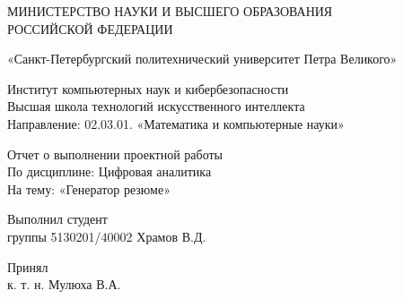 \documentclass[a4paper, 14pt]{extarticle} %
\begin{document}
    \begin{titlepage}
        \thispagestyle{empty}
        
        \begin{center}
        
            { \large МИНИСТЕРСТВО НАУКИ И ВЫСШЕГО ОБРАЗОВАНИЯ \\ 
                РОССИЙСКОЙ ФЕДЕРАЦИИ }
             
            { «Санкт-Петербургский политехнический университет Петра Великого» }
            
            { Институт компьютерных наук и кибербезопасности \\ 
                Высшая школа технологий искусственного интеллекта \\
                Направление: 02.03.01. «Математика и компьютерные науки» \\ }        
              
              \vspace{3cm}
            { \large Отчет о выполнении проектной работы\\ 
              По дисциплине: Цифровая аналитика \\ 
              На тему: «Генератор резюме»}
    
        \end{center}
    
        \vspace{3cm}

        \begin{center}
            \noindent
            \begin{minipage}[t]{\textwidth}
                \raggedright Выполнил студент  \\ группы 5130201/40002 \hfill 
                \underline{\hspace{3cm}} Храмов В.Д.
            \end{minipage}
            
            \vspace{1cm}
            
            \noindent
            \begin{minipage}[t]{\textwidth}
                \raggedright Принял \\ к. т. н. \hfill 
                \underline{\hspace{3cm}} Мулюха В.А.
            \end{minipage}
        \end{center}
        

\end{titlepage}
\end{document}
